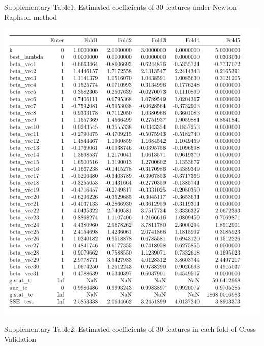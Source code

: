 \documentclass[]{article}
\begin{document}
\begin{center}
Supplementary Table1: Estimated coefficients of 30 features under Newton-Raphson method
\end{center}

\begin{center}
\includegraphics{./results/coef of all 30 predictors in logistic lasso.png}
\end{center}

\begin{center}
Supplementary Table2: Estimated coefficients of 30 features in each fold of Cross Validation
\end{center}
\end{document}
